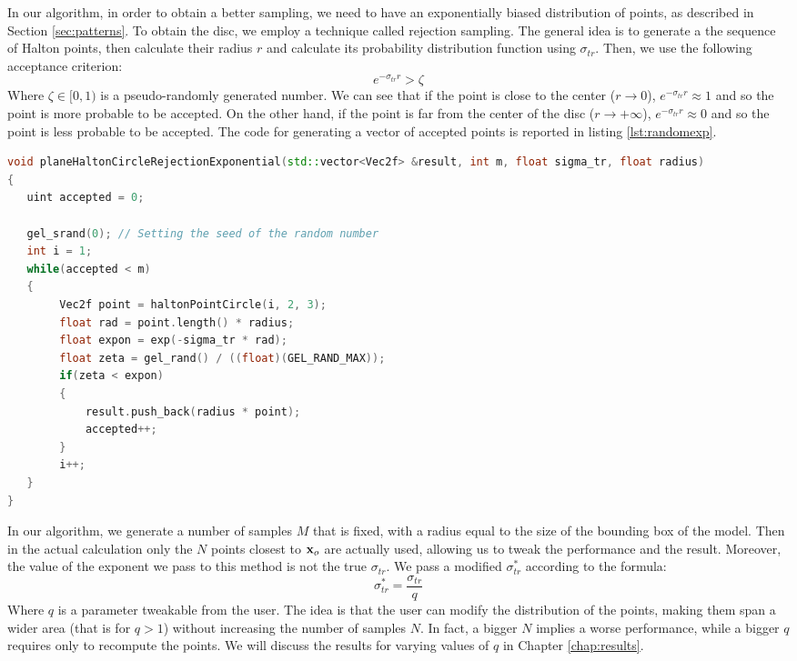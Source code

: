 In our algorithm, in order to obtain a better sampling, we need to have an exponentially biased distribution of points, as described in Section \ref{sec:patterns}. To obtain the disc, we employ a technique called rejection sampling. The general idea is to generate a the sequence of Halton points, then calculate their radius $r$ and calculate its probability distribution function using $\sigma_{tr}$. Then, we use the following acceptance criterion:
$$
e^{-\sigma_{tr} r} > \zeta
$$
Where $\zeta \in [0,1)$ is a pseudo-randomly generated number. We can see that if the point is close to the center ($r \rightarrow 0$), $e^{-\sigma_{tr} r} \approx 1$ and so the point is more probable to be accepted. On the other hand, if the point is far from the center of the disc ($r \rightarrow +\infty$), $e^{-\sigma_{tr} r} \approx 0$ and so the point is less probable to be accepted. The code for generating a vector of accepted points is reported in listing \ref{lst:randomexp}.

\begin{lstlisting}[language=C++,label=lst:randomexp,caption={Generation by rejection of a exponentially distributed disc. The function generates $M$ points with distribution $e^{-\sigma_{tr} r}$, and where \gl{radius} is the maximum final radius of the points.}]
void planeHaltonCircleRejectionExponential(std::vector<Vec2f> &result, int m, float sigma_tr, float radius)
{
   uint accepted = 0;

   gel_srand(0); // Setting the seed of the random number
   int i = 1;
   while(accepted < m)
   {
        Vec2f point = haltonPointCircle(i, 2, 3);
        float rad = point.length() * radius;
        float expon = exp(-sigma_tr * rad);
        float zeta = gel_rand() / ((float)(GEL_RAND_MAX));
        if(zeta < expon)
        {
            result.push_back(radius * point);
            accepted++;
        }
        i++;
   }
}
\end{lstlisting}

In our algorithm, we generate a number of samples $M$ that is fixed, with a radius equal to the size of the bounding box of the model. Then in the actual calculation only the $N$ points closest to $\mathbf{x}_o$ are actually used, allowing us to tweak the performance and the result. Moreover, the value of the exponent we pass to this method is not the true $\sigma_{tr}$. We pass a modified $\sigma_{tr}^*$ according to the formula:
$$
\sigma_{tr}^* = \frac{\sigma_{tr}}{q}
$$
Where $q$ is a parameter tweakable from the user. The idea is that the user can modify the distribution of the points, making them span a wider area (that is for $q > 1$) without increasing the number of samples $N$. In fact, a bigger $N$ implies a worse performance, while a bigger $q$ requires only to recompute the points. We will discuss the results for varying values of $q$ in Chapter \ref{chap:results}. 

